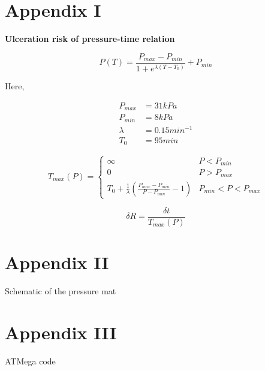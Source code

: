 \chapter*{Appendix I}
\label{chapter:appendix1}

\textbf{Ulceration risk of pressure-time relation}

\begin{equation}
    P(T) = \frac{P_{max}-P_{min}}{1 + e^{\lambda(T-T_0)}} + P_{min}
\end{equation}

Here,

\begin{align*}
    P_{max} &= 31 kPa\\
    P_{min} &= 8 kPa\\
    \lambda &= 0.15 min^{-1}\\
    T_0     &= 95 min
\end{align*}


\begin{equation}
    T_{max}(P) = 
    \begin{cases}
        \infty & P < P_{min}\\
        0  & P > P_{max}\\
        T_0 + \frac{1}{\lambda}\left( \frac{P_{max}-P_{min}}{P-P_{min}} - 1 \right) & P_{min} < P < P_{max}
    \end{cases}
\end{equation}

\begin{equation}
    \delta R = \frac{\delta t}{T_{max}(P)}
\end{equation}


\chapter*{Appendix II}
\label{chapter:appendix2}

Schematic of the pressure mat



% 


\chapter*{Appendix III}
\label{chapter:appendix3}

ATMega code

\cite{Anurag17}